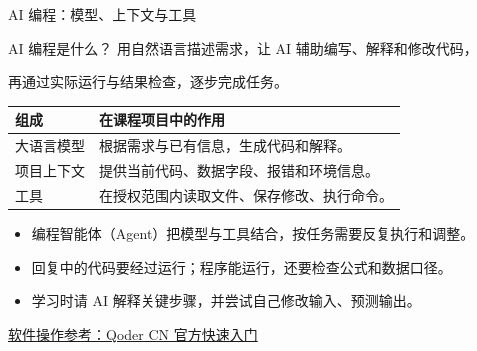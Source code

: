 \documentclass[9pt]{ctexbeamer}
\begin{document}
\begin{frame}{AI 编程：模型、上下文与工具}
  \begin{block}{AI 编程是什么？}
    用自然语言描述需求，让 AI 辅助编写、解释和修改代码，\par
    再通过实际运行与结果检查，逐步完成任务。
  \end{block}
  \begin{tabular}{p{}p{}}
    \toprule
    组成 & 在课程项目中的作用 \\
    \midrule
    大语言模型 & 根据需求与已有信息，生成代码和解释。\\[7pt]
    项目上下文 & 提供当前代码、数据字段、报错和环境信息。\\[7pt]
    工具 & 在授权范围内读取文件、保存修改、执行命令。\\
    \bottomrule
  \end{tabular}
  \vspace{0.2cm}
  \begin{itemize}
    \item 编程智能体（Agent）把模型与工具结合，按任务需要反复执行和调整。
    \item 回复中的代码要经过运行；程序能运行，还要检查公式和数据口径。
    \item 学习时请 AI 解释关键步骤，并尝试自己修改输入、预测输出。
  \end{itemize}
  {\tiny\href{https://docs.qoder.cn/qoder/quickstart}{软件操作参考：Qoder CN 官方快速入门}}
\end{frame}
\end{document}

